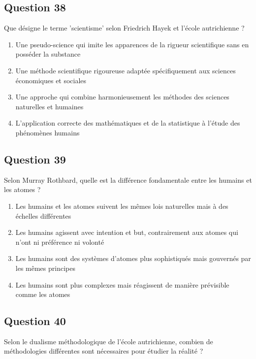 \documentclass[12pt,a4paper]{article}
\begin{document}
\bigskip


\subsection*{Question 38}
Que désigne le terme 'scientisme' selon Friedrich Hayek et l'école autrichienne ?

\begin{enumerate}[label=\Alph*., leftmargin=*]
\item Une pseudo-science qui imite les apparences de la rigueur scientifique sans en posséder la substance
\item Une méthode scientifique rigoureuse adaptée spécifiquement aux sciences économiques et sociales
\item Une approche qui combine harmonieusement les méthodes des sciences naturelles et humaines
\item L'application correcte des mathématiques et de la statistique à l'étude des phénomènes humains
\end{enumerate}

\bigskip


\subsection*{Question 39}
Selon Murray Rothbard, quelle est la différence fondamentale entre les humains et les atomes ?

\begin{enumerate}[label=\Alph*., leftmargin=*]
\item Les humains et les atomes suivent les mêmes lois naturelles mais à des échelles différentes
\item Les humains agissent avec intention et but, contrairement aux atomes qui n'ont ni préférence ni volonté
\item Les humains sont des systèmes d'atomes plus sophistiqués mais gouvernés par les mêmes principes
\item Les humains sont plus complexes mais réagissent de manière prévisible comme les atomes
\end{enumerate}

\bigskip


\subsection*{Question 40}
Selon le dualisme méthodologique de l'école autrichienne, combien de méthodologies différentes sont nécessaires pour étudier la réalité ?
\end{document}
